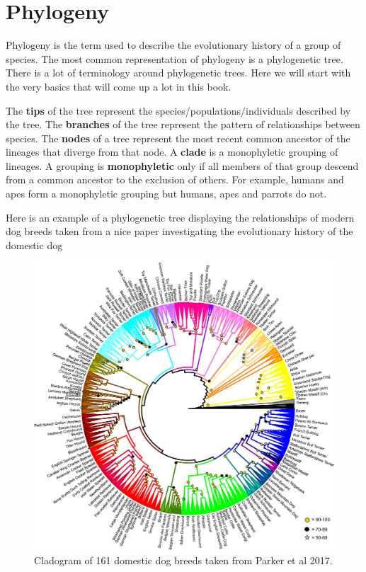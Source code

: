 \documentclass[
]{book}
\begin{document}
\hypertarget{phylogeny}{%
\section{Phylogeny}\label{phylogeny}}

Phylogeny is the term used to describe the evolutionary history of a group of species. The most common representation of phylogeny is a phylogenetic tree. There is a lot of terminology around phylogenetic trees. Here we will start with the very basics that will come up a lot in this book.

The \textbf{tips} of the tree represent the species/populations/individuals described by the tree. The \textbf{branches} of the tree represent the pattern of relationships between species. The \textbf{nodes} of a tree represent the most recent common ancestor of the lineages that diverge from that node. A \textbf{clade} is a monophyletic grouping of lineages. A grouping is \textbf{monophyletic} only if all members of that group descend from a common ancestor to the exclusion of others. For example, humans and apes form a monophyletic grouping but humans, apes and parrots do not.

Here is an example of a phylogenetic tree displaying the relationships of modern dog breeds taken from a nice paper investigating the evolutionary history of the domestic dog \citep{Parker17}

\begin{figure}[H]

{\centering \includegraphics[width=40.17in]{Images/dogs} 

}

\caption{Cladogram of 161 domestic dog breeds taken from Parker et al 2017.}\label{fig:unnamed-chunk-18}
\end{figure}
\end{document}
